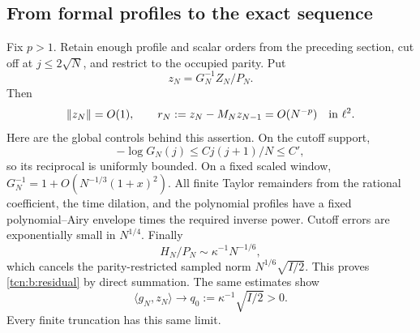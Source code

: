 \documentclass[11pt,letterpaper]{article}
\newcommand{\norm}[1]{\left\lVert#1\right\rVert}
\newcommand{\ip}[2]{\langle#1,#2\rangle}
\theoremstyle{remark}
\begin{document}
\subsection{From formal profiles to the exact sequence}\label{tcn:b:sec:route7}
Fix $p>1$. Retain enough profile and scalar orders from the preceding section, cut off at $j\le2\sqrt N$, and restrict to the occupied parity. Put
\[
 z_N=G_N^{-1}Z_N/P_N.
\]
Then
\begin{equation}
 \norm{z_N}=O(1),\qquad
 r_N:=z_N-M_Nz_{N-1}=O(N^{-p})\quad\hbox{in }\ell^2.        \label{tcn:b:residual}
\end{equation}
Here are the global controls behind this assertion. On the cutoff support,
\[
 -\log G_N(j)\le Cj(j+1)/N\le C',
\]
so its reciprocal is uniformly bounded. On a fixed scaled window,
$G_N^{-1}=1+O(N^{-1/3}(1+x)^2)$. All finite Taylor remainders from the rational coefficient, the time dilation, and the polynomial profiles have a fixed polynomial--Airy envelope times the required inverse power. Cutoff errors are exponentially small in $N^{1/4}$. Finally
\[
 H_N/P_N\sim\kappa^{-1}N^{-1/6},
\]
which cancels the parity-restricted sampled norm $N^{1/6}\sqrt{I/2}$. This proves \eqref{tcn:b:residual} by direct summation. The same estimates show
\begin{equation}
 \ip{g_N}{z_N}\longrightarrow q_0:=\kappa^{-1}\sqrt{I/2}>0.
 \label{tcn:b:q0}
\end{equation}
Every finite truncation has this same limit.
\end{document}
